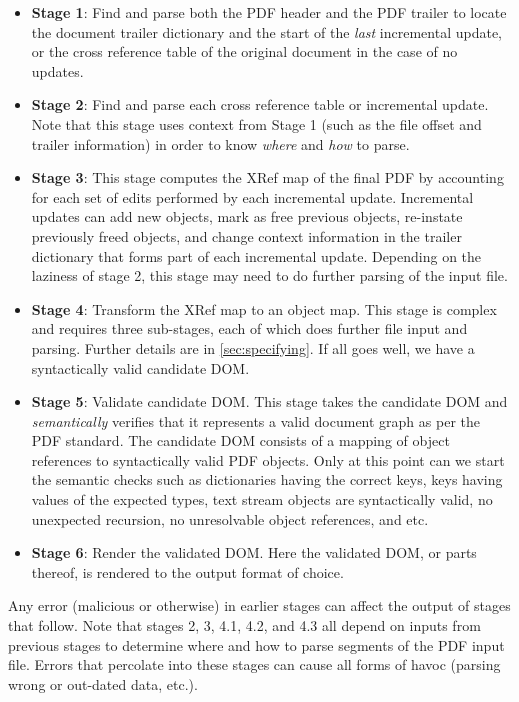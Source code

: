 \begin{itemize}
\item \textbf{Stage 1}: Find and parse both the PDF header and the PDF trailer to locate
  the document trailer dictionary and the start of the \emph{last} incremental update, or
  the cross reference table of the original document in the case of no updates.
\item \textbf{Stage 2}: Find and parse each cross reference table or incremental update. 
  Note that this stage uses context from Stage 1 (such as the file offset and trailer
  information) in order to know \emph{where} and \emph{how} to parse.
\item \textbf{Stage 3}: This stage computes the
   XRef map of the final PDF by accounting for each set of edits performed by each incremental update.
   Incremental updates can add new objects, mark as free previous objects, re-instate previously 
   freed objects, and change context information in the trailer dictionary that 
   forms part of each incremental update.
   Depending on the laziness of stage 2, this stage may need to do further
   parsing of the input file.
\item \textbf{Stage 4}: Transform the XRef map to an object map. This stage is complex and
  requires three sub-stages, each of which does further file input and parsing.
  Further details are in \cref{sec:specifying}.
  If all goes well, we have a syntactically valid candidate DOM.
\item \textbf{Stage 5}: Validate candidate DOM.  This stage takes the candidate DOM and
  \emph{semantically} verifies that it represents a valid document graph as per
  the PDF standard.
  The candidate DOM consists of a mapping of object references to
  syntactically valid PDF objects.  
  Only at this point can we start the semantic checks such as
  dictionaries having the correct keys,
  keys having values of the expected types,
  text stream objects are syntactically valid,
  no unexpected recursion, no unresolvable object references,
  and etc.
\item \textbf{Stage 6}: Render the validated DOM. Here the validated DOM, or parts thereof, is rendered
  to the output format of choice.
\end{itemize}

Any error (malicious or otherwise) in earlier stages can affect the output of stages that follow.
Note that stages 2, 3, 4.1, 4.2, and 4.3 all depend on inputs from previous stages to determine 
where and how to parse segments of the PDF input file.
Errors that percolate into these stages can
cause all forms of havoc (parsing wrong or out-dated data, etc.).


